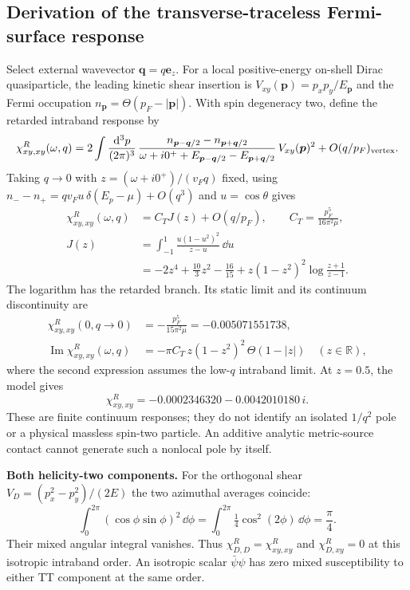 \documentclass[11pt,a4paper]{article}
\begin{document}
\subsection{Derivation of the transverse-traceless Fermi-surface response}
Select external wavevector $\bm q=q\bm e_z$. For a local positive-energy on-shell Dirac quasiparticle, the leading kinetic shear insertion is $V_{xy}(\bm p)=p_xp_y/E_{\bm p}$ and the Fermi occupation $n_{\bm p}=\Theta(p_F-|\bm p|)$. With spin degeneracy two, define the retarded intraband response by
\begin{equation}\label{eq:qm006-bubble}
 \chi^R_{xy,xy}(\omega,q)=2\int\frac{\mathrm d^3p}{(2\pi)^3}\,\frac{n_{\bm p-\bm q/2}-n_{\bm p+\bm q/2}}{\omega+i0^++E_{\bm p-\bm q/2}-E_{\bm p+\bm q/2}}\,V_{xy}(\bm p)^2+O(q/p_F)_{\rm vertex}.
\end{equation}
Taking $q\to0$ with $z=(\omega+i0^+)/(v_Fq)$ fixed, using $n_- - n_+=qv_Fu\,\delta(E_p-\mu)+O(q^3)$ and $u=\cos\theta$ gives
\begin{equation}\label{eq:qm006-J}
 \boxed{\begin{aligned}
 \chi^R_{xy,xy}(\omega,q)&=C_TJ(z)+O(q/p_F),\qquad C_T=\frac{p_F^5}{16\pi^2\mu},\\
 J(z)&=\int_{-1}^{1}\frac{u(1-u^2)^2}{z-u}\,\dd u\\
 &=-2z^4+\frac{10}{3}z^2-\frac{16}{15}+z(1-z^2)^2\log\frac{z+1}{z-1}.
 \end{aligned}}
\end{equation}
The logarithm has the retarded branch. Its static limit and its continuum discontinuity are
\begin{equation}\label{eq:qm006-static-cut}
 \boxed{\begin{aligned}
 \chi^R_{xy,xy}(0,q\to0)&=-\frac{p_F^5}{15\pi^2\mu}=-0.005071551738,\\
 \operatorname{Im}\chi^R_{xy,xy}(\omega,q)&=-\pi C_T\,z(1-z^2)^2\,\Theta(1-|z|)\quad(z\in\mathbb R),
 \end{aligned}}
\end{equation}
where the second expression assumes the low-$q$ intraband limit. At $z=0.5$, the model gives
\[\chi^R_{xy,xy}=-0.0002346320-0.0042010180\,i.\] These are finite continuum responses; they do not identify an isolated $1/q^2$ pole or a physical massless spin-two particle. An additive analytic metric-source contact cannot generate such a nonlocal pole by itself.

\noindent\textbf{Both helicity-two components.} For the orthogonal shear $V_D=(p_x^2-p_y^2)/(2E)$ the two azimuthal averages coincide:
\[\int_0^{2\pi} (\cos\phi\sin\phi)^2\,\dd\phi=\int_0^{2\pi}\tfrac14\cos^2(2\phi)\,\dd\phi=\frac\pi4.\]
Their mixed angular integral vanishes. Thus $\chi^R_{D,D}=\chi^R_{xy,xy}$ and $\chi^R_{D,xy}=0$ at this isotropic intraband order. An isotropic scalar $\bar\psi\psi$ has zero mixed susceptibility to either TT component at the same order.
\end{document}
